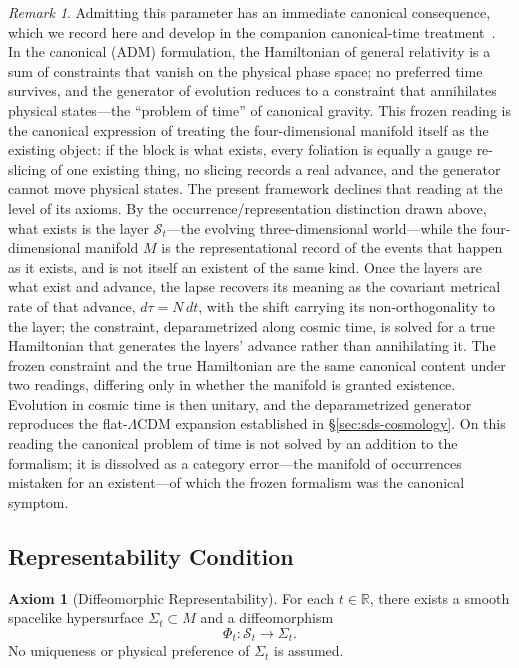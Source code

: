 \documentclass[11pt,a4paper]{article}
\theoremstyle{plain}
\theoremstyle{definition}
\newtheorem{axiom}{Axiom}
\theoremstyle{remark}
\newtheorem{remark}{Remark}
\begin{document}
\begin{remark}
Admitting this parameter has an immediate canonical consequence, which we record here and develop in the companion canonical-time treatment~\cite{JanzenCanonicalTime}. In the canonical (ADM) formulation, the Hamiltonian of general relativity is a sum of constraints that vanish on the physical phase space; no preferred time survives, and the generator of evolution reduces to a constraint that annihilates physical states---the ``problem of time'' of canonical gravity. This frozen reading is the canonical expression of treating the four-dimensional manifold itself as the existing object: if the block is what exists, every foliation is equally a gauge re-slicing of one existing thing, no slicing records a real advance, and the generator cannot move physical states. The present framework declines that reading at the level of its axioms. By the occurrence/representation distinction drawn above, what exists is the layer $\mathcal{S}_t$---the evolving three-dimensional world---while the four-dimensional manifold $M$ is the representational record of the events that happen as it exists, and is not itself an existent of the same kind. Once the layers are what exist and advance, the lapse recovers its meaning as the covariant metrical rate of that advance, $d\tau = N\,dt$, with the shift carrying its non-orthogonality to the layer; the constraint, deparametrized along cosmic time, is solved for a true Hamiltonian that generates the layers' advance rather than annihilating it. The frozen constraint and the true Hamiltonian are the same canonical content under two readings, differing only in whether the manifold is granted existence. Evolution in cosmic time is then unitary, and the deparametrized generator reproduces the flat-$\Lambda$CDM expansion established in \S\ref{sec:sds-cosmology}. On this reading the canonical problem of time is not solved by an addition to the formalism; it is dissolved as a category error---the manifold of occurrences mistaken for an existent---of which the frozen formalism was the canonical symptom.
\end{remark}

\subsection{Representability Condition}

\begin{axiom}[Diffeomorphic Representability]
For each $t\in\mathbb{R}$, there exists a smooth spacelike hypersurface $\Sigma_t\subset M$ and a diffeomorphism
\[
\Phi_t:\mathcal{S}_t\rightarrow\Sigma_t.
\]
No uniqueness or physical preference of $\Sigma_t$ is assumed.
\end{axiom}
\end{document}
